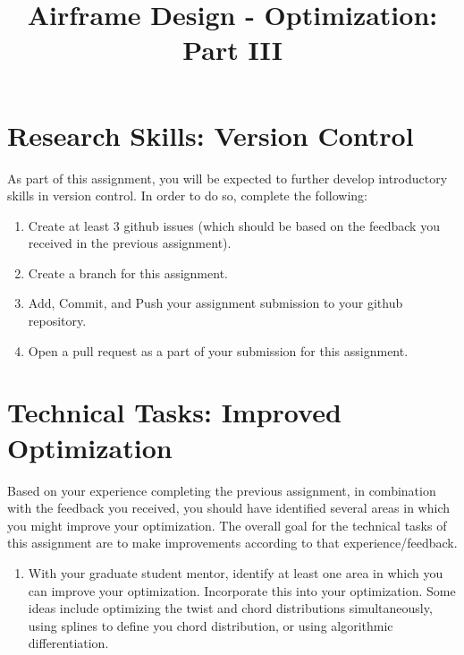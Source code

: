 \documentclass[11pt]{article}
\title{Airframe Design - Optimization: Part III}
\date{}
\begin{document}
	
\maketitle
\vspace{-2cm}

\section{Research Skills: Version Control}

As part of this assignment, you will be expected to further develop introductory skills in version control.
In order to do so, complete the following:
\begin{enumerate}[label=\alph*.]
	\item Create at least 3 github issues (which should be based on the feedback you received in the previous assignment).
	\item Create a branch for this assignment.
	\item Add, Commit, and Push your assignment submission to your github repository.
	\item Open a pull request as a part of your submission for this assignment.
\end{enumerate}

	



\section{Technical Tasks: Improved Optimization}
	
Based on your experience completing the previous assignment, in combination with the feedback you received, you should have identified several areas in which you might improve your optimization.
The overall goal for the technical tasks of this assignment are to make improvements according to that experience/feedback.

\begin{enumerate}[label=\alph*.]
	\item With your graduate student mentor, identify at least one area in which you can improve your optimization. Incorporate this into your optimization. Some ideas include optimizing the twist and chord distributions simultaneously, using splines to define you chord distribution, or using algorithmic differentiation.
\end{enumerate}
	
\end{document}

